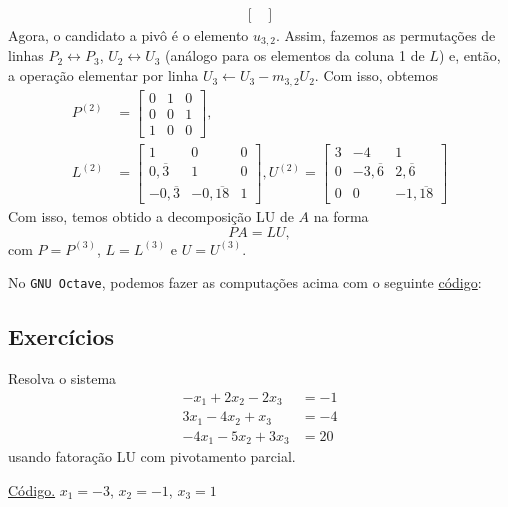 \begin{ex}
\begin{align}
\begin{bmatrix}
    \end{bmatrix}
  \end{align}
  Agora, o candidato a pivô é o elemento $u_{3,2}$. Assim, fazemos as permutações de linhas $P_2\leftrightarrow P_3$, $U_2 \leftrightarrow U_3$ (análogo para os elementos da coluna 1 de $L$) e, então, a operação elementar por linha $U_3\leftarrow U_3 - m_{3,2}U_2$. Com isso, obtemos
  \begin{align}
    P^{(2)} &=
    \begin{bmatrix}
      0 & 1 & 0\\
      0 & 0 & 1\\
      1 & 0 & 0
    \end{bmatrix},\\
    L^{(2)} &=
    \begin{bmatrix}
      1 & 0 & 0\\
      0,\overline{3} & 1 & 0\\
      -0,\overline{3} & -0,\overline{18} & 1      
    \end{bmatrix},
    U^{(2)} = 
    \begin{bmatrix}
      3 & -4 & 1\\
      0 & -3,\overline{6} & 2,\overline{6}\\
      0 & 0 & -1,\overline{18}
    \end{bmatrix}
  \end{align}
  Com isso, temos obtido a decomposição LU de $A$ na forma
  \begin{equation}
    PA = LU,
  \end{equation}
  com $P=P^{(3)}$, $L=L^{(3)}$ e $U=U^{(3)}$.

\ifisoctave
No \verb+GNU Octave+, podemos fazer as computações acima com o seguinte \href{https://github.com/phkonzen/notas/blob/master/src/MatematicaNumerica/cap_sl_direto/dados/ex_lup/ex_lup.m}{código}:

\fi
\end{ex}

\subsection*{Exercícios}

\begin{exer}\label{exer:lup_sol}
  Resolva o sistema
  \begin{align}
    -x_1 + 2x_2 - 2x_3 &= -1\\
    3x_1 - 4x_2 + x_3 &= -4\\
    -4x_1 - 5x_2 + 3x_3 &= 20
  \end{align}
  usando fatoração LU com pivotamento parcial.
\end{exer}
\begin{resp}
  \ifisoctave 
  \href{https://github.com/phkonzen/notas/blob/master/src/MatematicaNumerica/cap_sl_direto/dados/exer_lup_sol/exer_lup_sol.m}{Código.} 
  \fi
  $x_1 = -3$, $x_2=-1$, $x_3 = 1$
\end{resp}
